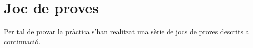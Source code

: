 \section{Joc de proves}

Per tal de provar la pràctica s'han realitzat una sèrie de jocs de proves
descrits a continuació.

